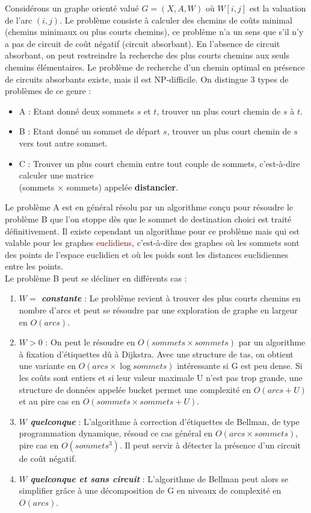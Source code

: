 \documentclass{article}
\newcommand{\red}[1]{\textcolor{darkred}{#1}}
\begin{document}
Considérons un graphe orienté valué $G=(X,A,W)$ où $W[i,j]$ est la valuation de l'arc $(i,j)$. Le problème consiste à calculer des chemins de coûts minimal (chemins minimaux ou 
plus courts chemins), ce problème n'a un sens que s'il n'y a pas de circuit de coût négatif (circuit absorbant). En l’absence de circuit absorbant, on peut restreindre la recherche
des plus courts chemins aux seuls chemins élémentaires. Le problème de recherche d’un chemin optimal en présence de circuits absorbants existe, mais il est NP-difficile. On 
distingue 3 types de problèmes de ce genre : 
\begin{itemize}
\item A : Etant donné deux sommets $s$ et $t$, trouver un plus court chemin de $s$ à $t$.
\item B : Etant donné un sommet de départ $s$, trouver un plus court chemin de $s$ vers tout autre sommet.
\item C : Trouver un plus court chemin entre tout couple de sommets, c’est-à-dire calculer une matrice \\ (sommets $\times$ sommets) appelée \textbf{distancier}.\\
\end{itemize}

\noindent Le problème A est en général résolu par un algorithme conçu pour résoudre le problème B que l'on stoppe dès que le sommet de destination choici est traité 
définitivement. Il existe cependant un algorithme pour ce problème mais qui est valable pour les graphes \red{euclidiens}, c'est-à-dire des graphes où les sommets sont des points 
de l'espace euclidien et où les poids sont les distances euclidiennes entre les points. \\

\noindent Le problème B peut se décliner en différents cas : 
\begin{enumerate}
\item \textbf{$W = $ \textit{constante}} :
Le problème revient à trouver des plus courts chemins en nombre d’arcs et peut se résoudre par une exploration de graphe en largeur en $O(arcs)$.
\item \textbf{$W > 0$} : 
On peut le résoudre en $O(sommets \times sommets)$ par un algorithme à fixation d’étiquettes dû à Dijkstra. Avec une structure de tas, on obtient une variante en $O(arcs 
\times \log sommets)$ intéressante si G est peu dense. Si les coûts sont entiers et si leur valeur maximale U n’est pas trop grande, une structure de données appelée bucket permet 
une complexité en $O(arcs+U)$ et au pire cas en $O(sommets \times sommets + U)$.
\item \textbf{$W$ \textit{quelconque}} :
L’algorithme à correction d’étiquettes de Bellman, de type programmation dynamique, résoud ce cas général en $O(arcs \times sommets)$, pire cas en $O(sommets^3)$. Il peut 
servir à détecter la présence d’un circuit de coût négatif.
\item \textbf{$W$ \textit{quelconque et sans circuit}} :
L’algorithme de Bellman peut alors se simplifier grâce à une décomposition de G en niveaux de complexité en $O(arcs)$. \\
\end{enumerate}
\end{document}
